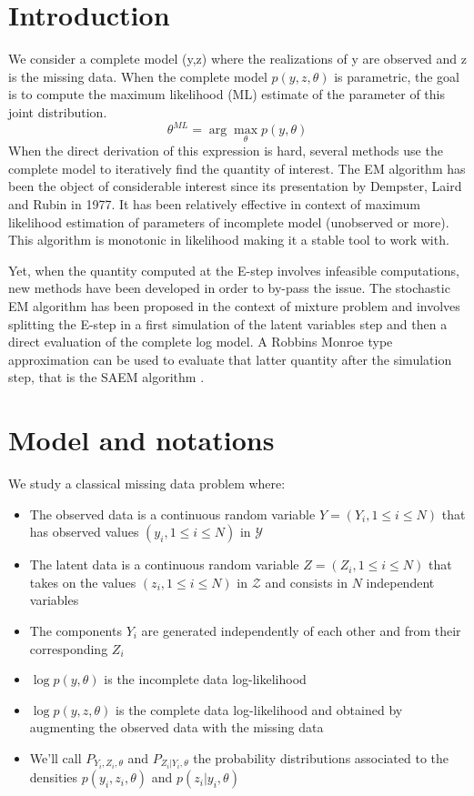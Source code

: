 \documentclass{article}
\begin{document}
\section{Introduction}

We consider a complete model (y,z) where the realizations of y are observed and z is the missing data. When the complete model $p(y,z,\theta)$ is parametric, the goal is to compute the maximum likelihood (ML) estimate of the parameter of this joint distribution.
\begin{equation}
\theta^{ML} = \arg\max \limits_{\theta} p(y,\theta)
\end{equation}
When the direct derivation of this expression is hard, several methods use the complete model to iteratively find the quantity of interest.
The EM algorithm has been the object of considerable interest since its presentation by Dempster, Laird and Rubin in 1977. It has been relatively effective in context of maximum likelihood estimation of parameters of incomplete model (unobserved or more). This algorithm is monotonic in likelihood making it a stable tool to work with.

Yet, when the quantity computed at the E-step involves infeasible computations, new methods have been developed in order to by-pass the issue. The stochastic EM algorithm \citep{diebolt} has been proposed in the context of mixture problem and involves splitting the E-step in a first simulation of the latent variables step and then a direct evaluation of the complete log model. A Robbins Monroe type approximation can be used to evaluate that latter quantity after the simulation step, that is the SAEM algorithm \citep{lavielle2,moulines}.



\section{Model and notations}
We study a classical missing data problem where:
\begin{itemize}
\item The observed data is a continuous random variable $Y = (Y_i, 1\leq i \leq N)$ that has observed values $(y_i, 1\leq i \leq N)$ in $\mathcal{Y}$
\item The latent data is a continuous random variable $Z = (Z_i, 1\leq i \leq N)$ that takes on the values $(z_i, 1\leq i \leq N)$ in $\mathcal{Z}$ and consists in $N$ independent variables
\item The components $Y_i$ are generated independently of each other and from their corresponding $Z_i$
\item $\log p(y,\theta)$ is the incomplete data log-likelihood
\item $\log p(y,z,\theta)$ is the complete data log-likelihood and obtained by augmenting the observed data with the missing data
\item We'll call $P_{Y_i,Z_i,\theta}$ and $P_{Z_i|Y_i,\theta}$ the probability distributions associated to the densities $p(y_i,z_i,\theta)$ and $p(z_i|y_i,\theta)$
\end{itemize}
\end{document}
